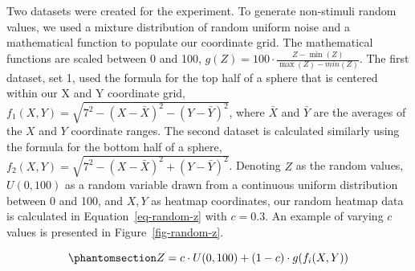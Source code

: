 \documentclass[phd]{nuthesis}
\begin{document}
Two datasets were created for the experiment. To generate non-stimuli
random values, we used a mixture distribution of random uniform noise
and a mathematical function to populate our coordinate grid. The
mathematical functions are scaled between 0 and 100,
\(g(Z)=100\cdot\frac{Z-\min(Z)}{\max(Z)-min(Z)}\). The first dataset,
set 1, used the formula for the top half of a sphere that is centered
within our X and Y coordinate grid,
\(f_1(X,Y)=\sqrt{7^2-(X-\bar{X})^2-(Y-\bar{Y})^2}\), where \(\bar{X}\)
and \(\bar{Y}\) are the averages of the \(X\) and \(Y\) coordinate
ranges. The second dataset is calculated similarly using the formula for
the bottom half of a sphere,
\(f_2(X,Y)=\sqrt{7^2-(X-\bar{X})^2+(Y-\bar{Y})^2}\). Denoting \(Z\) as
the random values, \(U(0,100)\) as a random variable drawn from a
continuous uniform distribution between 0 and 100, and \(X,Y\) as
heatmap coordinates, our random heatmap data is calculated in
Equation~\ref{eq-random-z} with \(c=0.3\). An example of varying \(c\)
values is presented in Figure~\ref{fig-random-z}.

\begin{equation}\phantomsection\label{eq-random-z}{
Z=c\cdot U(0,100)+(1-c)\cdot g(f_i(X,Y))
}\end{equation}
\end{document}
